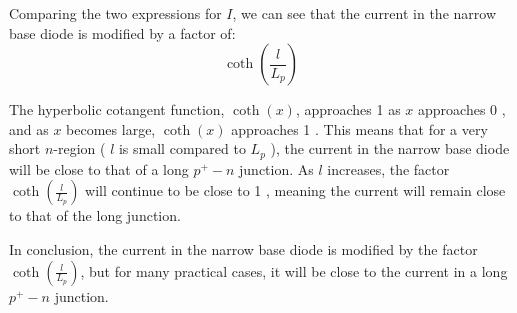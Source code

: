 Comparing the two expressions for $I$, we can see that the current in the narrow base diode is modified by a factor of:
$$
\operatorname{coth}\left(\frac{l}{L_p}\right)
$$

The hyperbolic cotangent function, $\operatorname{coth}(x)$, approaches 1 as $x$ approaches 0 , and as $x$ becomes large, $\operatorname{coth}(x)$ approaches 1 . This means that for a very short $n$-region ( $l$ is small compared to $L_p$ ), the current in the narrow base diode will be close to that of a long $p^{+}-n$ junction. As $l$ increases, the factor $\operatorname{coth}\left(\frac{l}{L_p}\right)$ will continue to be close to 1 , meaning the current will remain close to that of the long junction.

In conclusion, the current in the narrow base diode is modified by the factor $\operatorname{coth}\left(\frac{l}{L_p}\right)$, but for many practical cases, it will be close to the current in a long $p^{+}-n$ junction.